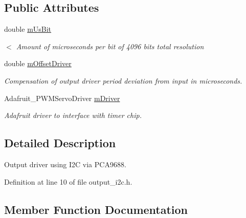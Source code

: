 \subsection*{Public Attributes}
\begin{DoxyCompactItemize}
\item 
double \hyperlink{classSPMB_1_1OutputDriverI2C_a1dc1d614d4e099105b124656a871aa83}{m\+Us\+Bit}\hypertarget{classSPMB_1_1OutputDriverI2C_a1dc1d614d4e099105b124656a871aa83}{}\label{classSPMB_1_1OutputDriverI2C_a1dc1d614d4e099105b124656a871aa83}

\begin{DoxyCompactList}\small\item\em $<$ Amount of microseconds per bit of 4096 bits total resolution \end{DoxyCompactList}\item 
double \hyperlink{classSPMB_1_1OutputDriverI2C_a8ab5bd3883d50cca560313b5275b81e5}{m\+Offset\+Driver}\hypertarget{classSPMB_1_1OutputDriverI2C_a8ab5bd3883d50cca560313b5275b81e5}{}\label{classSPMB_1_1OutputDriverI2C_a8ab5bd3883d50cca560313b5275b81e5}

\begin{DoxyCompactList}\small\item\em Compensation of output driver period deviation from input in microseconds. \end{DoxyCompactList}\item 
Adafruit\+\_\+\+P\+W\+M\+Servo\+Driver \hyperlink{classSPMB_1_1OutputDriverI2C_aecd74104de6faf86afbc9c1f9cd0b50a}{m\+Driver}\hypertarget{classSPMB_1_1OutputDriverI2C_aecd74104de6faf86afbc9c1f9cd0b50a}{}\label{classSPMB_1_1OutputDriverI2C_aecd74104de6faf86afbc9c1f9cd0b50a}

\begin{DoxyCompactList}\small\item\em Adafruit driver to interface with timer chip. \end{DoxyCompactList}\end{DoxyCompactItemize}


\subsection{Detailed Description}
Output driver using I2C via P\+C\+A9688. 

Definition at line 10 of file output\+\_\+i2c.\+h.



\subsection{Member Function Documentation}

